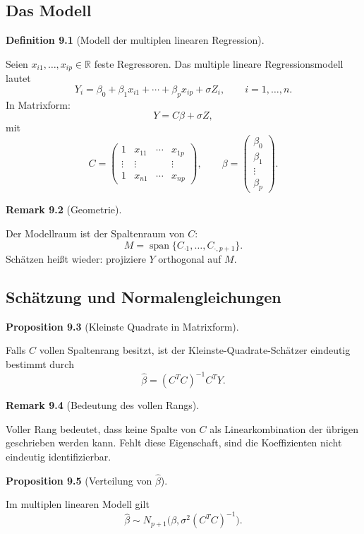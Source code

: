 \documentclass[10pt, letterpaper]{article}
\newcommand{\R}{\mathbb{R}}
\newcommand{\CustomHeading}[3]{%
  \par\medskip\noindent%
  \textbf{#1 #2} \textnormal{(#3)}.\enskip%
}
\newenvironment{DEF}[2]{\CustomHeading{Definition}{#1}{#2}}{}
\newenvironment{PROP}[2]{\CustomHeading{Proposition}{#1}{#2}}{}
\newenvironment{REM}[2]{\CustomHeading{Remark}{#1}{#2}}{}
\begin{document}
\subsection{Das Modell}

\begin{DEF}{9.1}{Modell der multiplen linearen Regression}
Seien \(x_{i1},\dots,x_{ip}\in \R\) feste Regressoren. Das multiple lineare Regressionsmodell lautet
\[
Y_i=\beta_0+\beta_1x_{i1}+\cdots+\beta_p x_{ip}+\sigma Z_i,\qquad i=1,\dots,n.
\]
In Matrixform:
\[
Y=C\beta+\sigma Z,
\]
mit
\[
C=
\begin{pmatrix}
1 & x_{11} & \cdots & x_{1p}\\
\vdots & \vdots & & \vdots\\
1 & x_{n1} & \cdots & x_{np}
\end{pmatrix},
\qquad
\beta=
\begin{pmatrix}
\beta_0\\
\beta_1\\
\vdots\\
\beta_p
\end{pmatrix}.
\]
\end{DEF}

\begin{REM}{9.2}{Geometrie}
Der Modellraum ist der Spaltenraum von \(C\):
\[
M=\operatorname{span}\{C_{\cdot 1},\dots,C_{\cdot,p+1}\}.
\]
Schätzen heißt wieder: projiziere \(Y\) orthogonal auf \(M\).
\end{REM}

\subsection{Schätzung und Normalengleichungen}

\begin{PROP}{9.3}{Kleinste Quadrate in Matrixform}
Falls \(C\) vollen Spaltenrang besitzt, ist der Kleinste-Quadrate-Schätzer eindeutig bestimmt durch
\[
\hat\beta=(C^TC)^{-1}C^TY.
\]
\end{PROP}

\begin{REM}{9.4}{Bedeutung des vollen Rangs}
Voller Rang bedeutet, dass keine Spalte von \(C\) als Linearkombination der übrigen geschrieben werden kann. Fehlt diese Eigenschaft, sind die Koeffizienten nicht eindeutig identifizierbar.
\end{REM}

\begin{PROP}{9.5}{Verteilung von \(\hat\beta\)}
Im multiplen linearen Modell gilt
\[
\hat\beta\sim N_{p+1}\bigl(\beta,\sigma^2(C^TC)^{-1}\bigr).
\]
\end{PROP}
\end{document}
